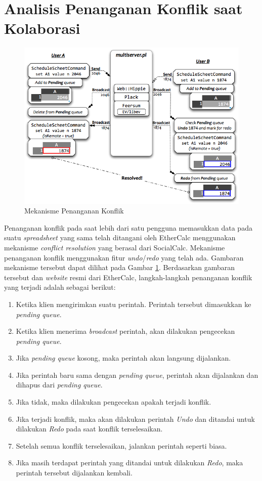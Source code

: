 \section{Analisis Penanganan Konflik saat Kolaborasi}

\begin{figure}[!htb]
    \centering
    \includegraphics[width=1\textwidth]{resources/chapter-3-conflict-res.png}
    \caption{Mekanisme Penanganan Konflik \citep{EtherCalc}}
	\label{MekanismeKonflik}
\end{figure}

Penanganan konflik pada saat lebih dari satu pengguna memasukkan data pada suatu \textit{spreadsheet} yang sama telah ditangani oleh EtherCalc menggunakan mekanisme \textit{conflict resolution} yang berasal dari SocialCalc. Mekanisme penanganan konflik menggunakan fitur \textit{undo}/\textit{redo} yang telah ada. Gambaran mekanisme tersebut dapat dilihat pada Gambar \ref{MekanismeKonflik}. Berdasarkan gambaran tersebut dan \textit{website} resmi dari EtherCalc, langkah-langkah penanganan konflik yang terjadi adalah sebagai berikut:

\begin{enumerate}
	\item Ketika klien mengirimkan suatu perintah. Perintah tersebut dimasukkan ke \textit{pending queue}.
	\item Ketika klien menerima \textit{broadcast} perintah, akan dilakukan pengecekan \textit{pending queue}.
	\item Jika \textit{pending queue} kosong, maka perintah akan langsung dijalankan.
	\item Jika perintah baru sama dengan \textit{pending queue}, perintah akan dijalankan dan dihapus dari \textit{pending queue}.
	\item Jika tidak, maka dilakukan pengecekan apakah terjadi konflik.
	\item Jika terjadi konflik, maka akan dilakukan perintah \textit{Undo} dan ditandai untuk dilakukan \textit{Redo} pada saat konflik terselesaikan.
	\item Setelah semua konflik terselesaikan, jalankan perintah seperti biasa.
	\item Jika masih terdapat perintah yang ditandai untuk dilakukan \textit{Redo}, maka perintah tersebut dijalankan kembali.
\end{enumerate}

